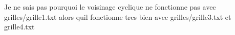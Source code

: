 Je ne sais pas pourquoi le voisinage cyclique ne fonctionne pas avec grilles/grille1.\+txt alors qu\textquotesingle{}il fonctionne tres bien avec grilles/grille3.\+txt et grille4.\+txt 